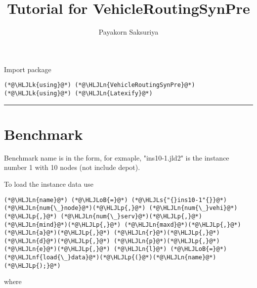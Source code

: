 \documentclass[12pt,a4paper]{article}
\title{ Tutorial for VehicleRoutingSynPre }
\author{ Payakorn Saksuriya }
\newcommand{\HLJLk}[1]{\textcolor[RGB]{148,91,176}{\textbf{#1}}}
\newcommand{\HLJLn}[1]{#1}
\newcommand{\HLJLnf}[1]{\textcolor[RGB]{66,102,213}{#1}}
\newcommand{\HLJLs}[1]{\textcolor[RGB]{201,61,57}{#1}}
\newcommand{\HLJLoB}[1]{\textcolor[RGB]{102,102,102}{\textbf{#1}}}
\newcommand{\HLJLp}[1]{#1}
\begin{document}
\maketitle

Import package


\begin{lstlisting}
(*@\HLJLk{using}@*) (*@\HLJLn{VehicleRoutingSynPre}@*)
(*@\HLJLk{using}@*) (*@\HLJLn{Latexify}@*)
\end{lstlisting}


\rule{\textwidth}{1pt}
\section{Benchmark}
Benchmark name is in the form, for exmaple, "ins10-1.jld2" is the instance number 1 with 10 nodes (not include depot).

To load the instance data use


\begin{lstlisting}
(*@\HLJLn{name}@*) (*@\HLJLoB{=}@*) (*@\HLJLs{"{}ins10-1"{}}@*)
(*@\HLJLn{num{\_}node}@*)(*@\HLJLp{,}@*) (*@\HLJLn{num{\_}vehi}@*)(*@\HLJLp{,}@*) (*@\HLJLn{num{\_}serv}@*)(*@\HLJLp{,}@*) (*@\HLJLn{mind}@*)(*@\HLJLp{,}@*) (*@\HLJLn{maxd}@*)(*@\HLJLp{,}@*) (*@\HLJLn{a}@*)(*@\HLJLp{,}@*) (*@\HLJLn{r}@*)(*@\HLJLp{,}@*) (*@\HLJLn{d}@*)(*@\HLJLp{,}@*) (*@\HLJLn{p}@*)(*@\HLJLp{,}@*) (*@\HLJLn{e}@*)(*@\HLJLp{,}@*) (*@\HLJLn{l}@*) (*@\HLJLoB{=}@*) (*@\HLJLnf{load{\_}data}@*)(*@\HLJLp{(}@*)(*@\HLJLn{name}@*)(*@\HLJLp{);}@*)
\end{lstlisting}


where
\end{document}

